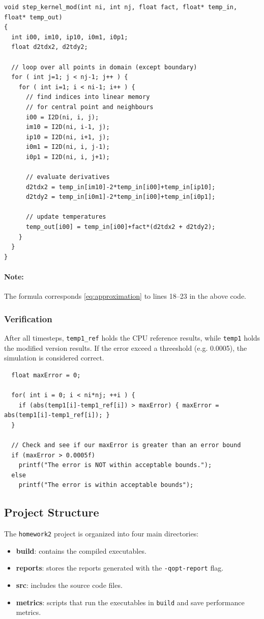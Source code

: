 \begin{lstlisting}
void step_kernel_mod(int ni, int nj, float fact, float* temp_in, float* temp_out)
{
  int i00, im10, ip10, i0m1, i0p1;
  float d2tdx2, d2tdy2;

  // loop over all points in domain (except boundary)
  for ( int j=1; j < nj-1; j++ ) {
    for ( int i=1; i < ni-1; i++ ) {
      // find indices into linear memory
      // for central point and neighbours
      i00 = I2D(ni, i, j);
      im10 = I2D(ni, i-1, j);
      ip10 = I2D(ni, i+1, j);
      i0m1 = I2D(ni, i, j-1);
      i0p1 = I2D(ni, i, j+1);

      // evaluate derivatives
      d2tdx2 = temp_in[im10]-2*temp_in[i00]+temp_in[ip10];
      d2tdy2 = temp_in[i0m1]-2*temp_in[i00]+temp_in[i0p1];

      // update temperatures
      temp_out[i00] = temp_in[i00]+fact*(d2tdx2 + d2tdy2);
    }
  }
}
\end{lstlisting}
\paragraph*{Note:} The formula corresponds \eqref{eq:approximation} to lines 18–23 in the above code.

\subsubsection*{Verification}
After all timesteps, \texttt{temp1\_ref} holds the CPU reference results, while \texttt{temp1} holds the modified version results. If the error exceed a threeshold (e.g. 0.0005), the simulation is considered correct.

\begin{lstlisting}
  float maxError = 0;

  for( int i = 0; i < ni*nj; ++i ) {
    if (abs(temp1[i]-temp1_ref[i]) > maxError) { maxError = abs(temp1[i]-temp1_ref[i]); }
  }

  // Check and see if our maxError is greater than an error bound
  if (maxError > 0.0005f)
    printf("The error is NOT within acceptable bounds.");
  else
    printf("The error is within acceptable bounds");
\end{lstlisting}

\subsection{Project Structure}
The \texttt{homework2} project is organized into four main directories:
\begin{itemize}
    \item \textbf{build}: contains the compiled executables.
    \item \textbf{reports}: stores the reports generated with the \texttt{-qopt-report} flag.
    \item \textbf{src}: includes the source code files.
    \item \textbf{metrics}: scripts that run the executables in \texttt{build} and save performance metrics.
\end{itemize}

